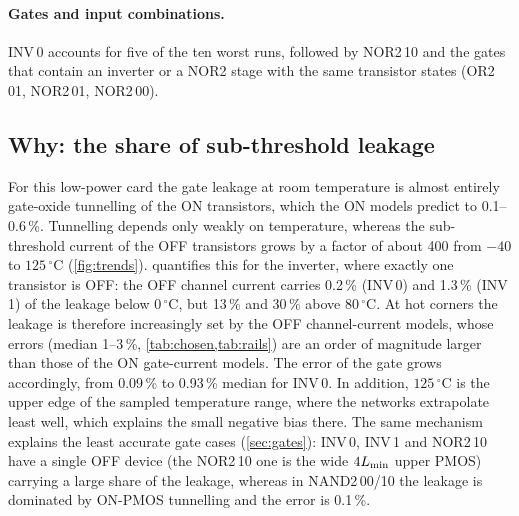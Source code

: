 \paragraph{Gates and input combinations.} INV\,0 accounts for five of the ten worst runs, followed by NOR2\,10 and the gates that contain an
inverter or a NOR2 stage with the same transistor states (OR2\,01, NOR2\,01, NOR2\,00).

\subsection{Why: the share of sub-threshold leakage}
For this low-power card the gate leakage at room temperature is almost entirely gate-oxide tunnelling of the ON transistors, which the ON models predict
to 0.1--0.6\,\%. Tunnelling depends only weakly on temperature, whereas the sub-threshold current of the OFF transistors grows by a factor of about
400 from $-40$ to $125\,^\circ$C (\cref{fig:trends}).  quantifies this for the inverter, where exactly one transistor is OFF: the
OFF channel current carries 0.2\,\% (INV\,0) and 1.3\,\% (INV\,1) of the leakage below $0\,^\circ$C, but 13\,\% and 30\,\% above $80\,^\circ$C.
At hot corners the leakage is therefore increasingly set by the OFF channel-current models, whose errors (median 1--3\,\%, \cref{tab:chosen,tab:rails})
are an order of magnitude larger than those of the ON gate-current models. The error of the gate grows accordingly, from 0.09\,\% to 0.93\,\% median
for INV\,0. In addition, $125\,^\circ$C is the upper edge of the sampled temperature range, where the networks extrapolate least well, which explains
the small negative bias there. The same mechanism explains the least accurate gate cases (\cref{sec:gates}): INV\,0, INV\,1 and NOR2\,10 have a single
OFF device (the NOR2\,10 one is the wide $4L_{\min}$ upper PMOS) carrying a large share of the leakage, whereas in NAND2\,00/10 the leakage is dominated
by ON-PMOS tunnelling and the error is 0.1\,\%.


